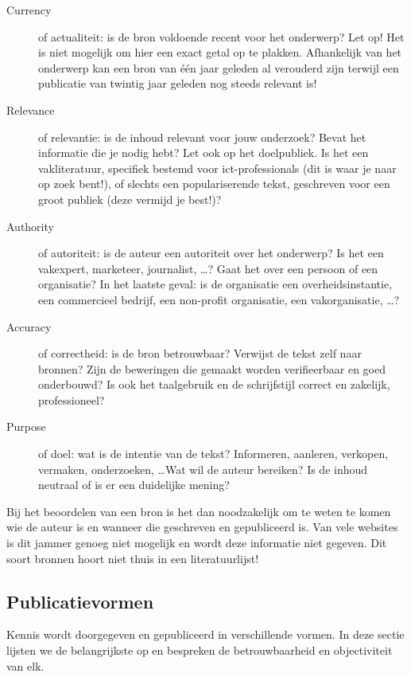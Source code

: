 \begin{description}
  \item[Currency] of actualiteit: is de bron voldoende recent voor het onderwerp? Let op! Het is niet mogelijk om hier een exact getal op te plakken. Afhankelijk van het onderwerp kan een bron van één jaar geleden al verouderd zijn terwijl een publicatie van twintig jaar geleden nog steeds relevant is!

  \item[Relevance] of relevantie: is de inhoud relevant voor jouw onderzoek? Bevat het informatie die je nodig hebt? Let ook op het doelpubliek. Is het een vakliteratuur, specifiek bestemd voor ict-professionals (dit is waar je naar op zoek bent!), of slechts een populariserende tekst, geschreven voor een groot publiek (deze vermijd je best!)?

  \item[Authority] of autoriteit: is de auteur een autoriteit over het onderwerp? Is het een vakexpert, marketeer, journalist, \ldots? Gaat het over een persoon of een organisatie? In het laatste geval: is de organisatie een overheidsinstantie, een commercieel bedrijf, een non-profit organisatie, een vakorganisatie, \ldots?

  \item[Accuracy] of correctheid: is de bron betrouwbaar? Verwijst de tekst zelf naar bronnen? Zijn de beweringen die gemaakt worden verifieerbaar en goed onderbouwd? Is ook het taalgebruik en de schrijfstijl correct en zakelijk, professioneel?

  \item[Purpose] of doel: wat is de intentie van de tekst? Informeren, aanleren, verkopen, vermaken, onderzoeken, \ldots Wat wil de auteur bereiken? Is de inhoud neutraal of is er een duidelijke mening?
\end{description}

Bij het beoordelen van een bron is het dan noodzakelijk om te weten te komen wie de auteur is en wanneer die geschreven en gepubliceerd is. Van vele websites is dit jammer genoeg niet mogelijk en wordt deze informatie niet gegeven. Dit soort bronnen hoort niet thuis in een literatuurlijst!

\subsection{Publicatievormen}%
\label{sub:publicatievormen}

Kennis wordt doorgegeven en gepubliceerd in verschillende vormen. In deze sectie lijsten we de belangrijkste op en bespreken de betrouwbaarheid en objectiviteit van elk.

